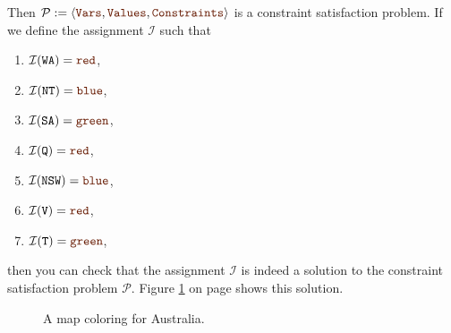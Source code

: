 Then $\mathcal{P} := \langle \mytt{Vars}, \mytt{Values}, \mytt{Constraints} \rangle$ is a constraint satisfaction problem.  
If we define the assignment $\mathcal{I}$ such that
\begin{enumerate}
\item $\mathcal{I}(\mathtt{WA}) = \mytt{red}$,
\item $\mathcal{I}(\mathtt{NT}) = \mytt{blue}$,
\item $\mathcal{I}(\mathtt{SA}) = \mytt{green}$,
\item $\mathcal{I}(\mathtt{Q}) = \mytt{red}$,
\item $\mathcal{I}(\mathtt{NSW}) = \mytt{blue}$,
\item $\mathcal{I}(\mathtt{V}) = \mytt{red}$,
\item $\mathcal{I}(\mathtt{T}) = \mytt{green}$,
\end{enumerate}
then you can check that the assignment $\mathcal{I}$ is indeed a solution to the constraint satisfaction problem $\mathcal{P}$.
Figure \ref{fig:australia-solution.png} on page \pageref{fig:australia-solution.png} shows this solution.

\begin{figure}[!ht]
  \centering
  \caption{A map coloring for Australia.}
  \label{fig:australia-solution.png}
\end{figure}


